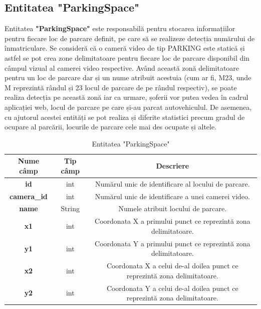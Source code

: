 \documentclass[12pt]{article}
\begin{document}
\subsection{Entitatea "ParkingSpace"}

Entitatea \textbf{"ParkingSpace"} este responsabil\u{a} pentru stocarea informațiilor pentru fiecare loc de parcare definit, pe care s\u{a} se realizeze detecția num\u{a}rului de \^{i}nmatriculare. Se consider\u{a} c\u{a} o camer\u{a} video de tip PARKING este static\u{a} și astfel se pot crea zone delimitatoare pentru fiecare loc de parcare disponibil din c\^{a}mpul vizual al camerei video respective. Av\^{a}nd aceast\u{a} zon\u{a} delimitatoare pentru un loc de parcare dar și un nume atribuit acestuia (cum ar fi, M23, unde M reprezint\u{a} r\^{a}ndul și 23 locul de parcare de pe r\^{a}ndul respectiv), se poate realiza detecția pe aceast\u{a} zon\u{a} iar ca urmare, șoferii vor putea vedea \^{i}n cadrul aplicației web, locul de parcare pe care și-au parcat autovehiculul. De asemenea, cu ajutorul acestei entit\u{a}ți se pot realiza și diferite statistici precum gradul de ocupare al parc\u{a}rii, locurile de parcare cele mai des ocupate și altele.

\begin{table}[h]
\centering
\begin{tabular}{|c|c|c|}
\hline
\textbf{Nume c\^{a}mp}  & \textbf{Tip c\^{a}mp} & \textbf{Descriere} \\
\hline
\textbf{id} & int & Num\u{a}rul unic de identificare al locului de parcare.  \\
\hline
\textbf{camera\_id} & int & Num\u{a}rul unic de identificare a unei camerei video. \\
\hline
\textbf{name} & String & Numele atribuit locului de parcare.  \\
\hline
\textbf{x1} & int & Coordonata X a primului punct ce reprezint\u{a} zona delimitatoare.  \\
\hline
\textbf{y1} & int & Coordonata Y a primului punct ce reprezint\u{a} zona delimitatoare.  \\
\hline
\textbf{x2} & int & Coordonata X a celui de-al doilea punct ce reprezint\u{a} zona delimitatoare. \\
\hline
\textbf{y2} & int & Coordonata Y a celui de-al doilea punct ce reprezint\u{a} zona delimitatoare.  \\
\hline
\end{tabular}
\caption{Entitatea "ParkingSpace"}
\end{table}
\end{document}
